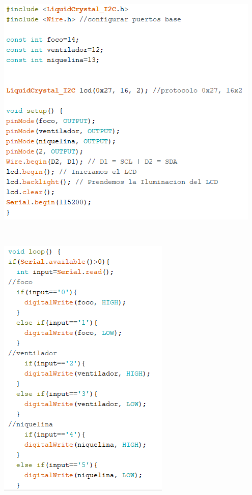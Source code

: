 \documentclass[12pt]{report}
\begin{document}
\begin{center}
\includegraphics[scale=0.8]{Documento/Figuras/10.PNG}
\begin{scriptsize}
\\ 
\end{scriptsize}
\end{center}
\begin{center}
\includegraphics[scale=0.8]{Documento/Figuras/11.PNG}
\begin{scriptsize}
\\ 
\end{scriptsize}
\end{center}
\end{document}
